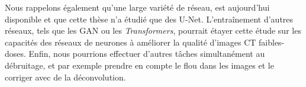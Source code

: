 Nous rappelons également qu'une large variété de réseau, est aujourd'hui disponible et que cette thèse n'a étudié que des U-Net. L'entraînement d'autres réseaux, tels que les GAN ou les \textit{Transformers}, pourrait étayer cette étude sur les capacités des réseaux de neurones à améliorer la qualité d'images CT faibles-doses. Enfin, nous pourrions effectuer d'autres tâches simultanément au débruitage, et par exemple prendre en compte le flou dans les images et le corriger avec de la déconvolution.

\newpage












